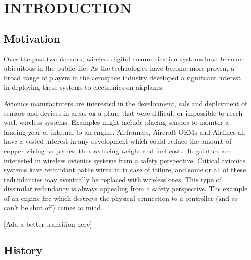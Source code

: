%
%
%
%



\pagestyle{plain} %
\setcounter{page}{1}


\chapter{\uppercase {Introduction}}


\section{Motivation}

Over the past two decades, wireless digital communication systems have become ubiquitous in the public life. As the technologies have become more proven, a broad range of players in the aerospace industry developed a significant interest in deploying these systems to electronics on airplanes. 

Avionics manufacturers are interested in the development, sale and deployment of sensors and devices in areas on a plane that were difficult or impossible to reach with wireless systems.  Examples might include placing sensors to monitor a landing gear or internal to an engine. Airframers, Aircraft OEMs and Airlines all have a vested interest in any development which could reduce the amount of copper wiring on planes, thus reducing weight and fuel costs. Regulators are interested in wireless avionics systems from a safety perspective. Critical avionics systems have redundant paths wired in in case of failure, and some or all of these redundancies may eventually be replaced  with wireless ones. This type of dissimilar redundancy is always appealing from a safety perspective. The example of an engine fire which destroys the physical connection to a controller (and so can't be shut off) comes to mind. 

[Add a better transition here]

\section{History} 


